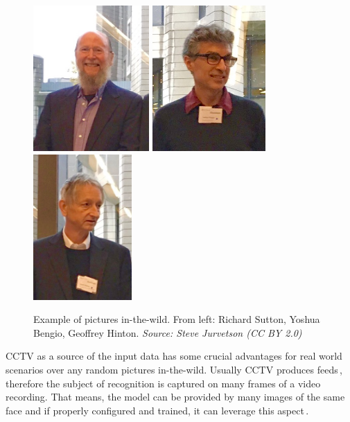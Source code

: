 \begin{figure}[ht]
    \centering
    \includegraphics[height=15em]{obrazky-figures/richard_sutton.jpg}
    \includegraphics[height=15em]{obrazky-figures/yoshua_bengio.jpg}
    \includegraphics[height=15em]{obrazky-figures/geoffrey_hinton.jpg}
    \caption[Example of pictures in{-}the{-}wild]{Example of pictures in{-}the{-}wild. From left: Richard Sutton, Yoshua Bengio, Geoffrey Hinton. \textit{Source: Steve Jurvetson (CC BY 2.0\footnotemark)}}
\end{figure}

CCTV as a source of the input data has some crucial advantages for real world scenarios over any random pictures in-the-wild. Usually CCTV produces feeds\,\cite{video}, therefore the subject of recognition is captured on many frames of a video recording. That means, the model can be provided by many images of the same face and if properly configured and trained, it can leverage this aspect\,\cite{biometricguide}.

